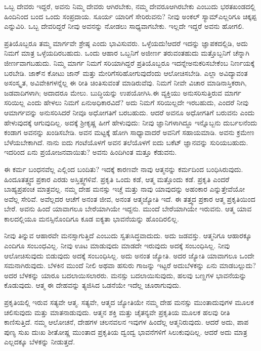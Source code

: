 ಒಬ್ಬ ದೇವರು ಇದ್ದರೆ, ಅವನು ನಿಮ್ಮ ದೇವರು ಆಗಿರಬೇಕು, ನಮ್ಮ ದೇವರೂ\break ಆಗಿರಬೇಕು ಎಂಬುದು ಭರತಖಂಡದಲ್ಲಿ ಹಿಂದಿನಿಂದ ಬಂದ ಒಂದು ಸಂಪ್ರದಾಯ. ಸೂರ್ಯ ಯಾರಿಗೆ ಸೇರಿರುವನು? ನೀವು ಅಂಕಲ್​ ಸ್ಯಾಮ್​ ಎಲ್ಲರಿಗೂ ಚಿಕ್ಕಪ್ಪ ಎನ್ನುವಿರಿ. ಒಬ್ಬ ದೇವರಿದ್ದರೆ ನೀವು ಅವನನ್ನು ನೋಡಲು ಸಾಧ್ಯವಾಗಬೇಕು. ಇಲ್ಲದೇ ಇದ್ದರೆ ಅವನು ಹೋಗಲಿ.

ಪ್ರತಿಯೊಬ್ಬರೂ ತಮ್ಮ ಮಾರ್ಗವೇ ಶ್ರೇಷ್ಠ ಎಂದು ಭಾವಿಸುವರು. ಒಳ್ಳೆಯದು!\break ಆದರೆ ಇದನ್ನು ಜ್ಞಾಪಕದಲ್ಲಿಡಿ, ಅದು ನಿಮಗೆ ಮಾತ್ರ ಒಳ್ಳೆಯದಿರಬಹುದು. ಒಂದು ಆಹಾರ ಒಬ್ಬನಿಗೆ ಅಜೀರ್ಣ ತರುವಂತಹುದು ಮತ್ತೊಬ್ಬನಿಗೆ ಚೆನ್ನಾಗಿ ಜೀರ್ಣವಾಗಬಹುದು. ನಿಮ್ಮ ಮಾರ್ಗ ನಿಮಗೆ ಸರಿಯಾಗಿದ್ದರೆ ಪ್ರತಿಯೊಬ್ಬರೂ ಇದನ್ನೇ\break ಅನುಕರಿಸಬೇಕೆಂಬ ನಿರ್ಣಯಕ್ಕೆ ಬರಬೇಡಿ. ಜಾಕ್​ನ ಕೋಟು ಜಾನ್​ ಮತ್ತು ಮೇರಿಗೆ\break ಸರಿಹೋಗುವುದೆಂದು ಆಲೋಚಿಸಬೇಡಿ. ಎಲ್ಲಾ ಅವಿದ್ಯಾವಂತ ಅಸಂಸ್ಕೃತ, ಅವಿವೇಕಿಗಳನ್ನೆಲ್ಲ ಈ ರೀತಿ ಚಿಂತಿಸುವಂತೆ ಮಾಡಿರುವೆವು. ನಿಮಗೆ ನೀವೇ ವಿಚಾರ ಮಾಡಿ\break ನಾಸ್ತಿಕರಾಗಿ, ಜಡವಾದಿಗಳಾಗಿ; ಅದಾದರೂ ಮೇಲು. ಬುದ್ಧಿಯನ್ನು ಉಪಯೋಗಿಸಿ.\break ಈ ವ್ಯಕ್ತಿಯು ಅನುಸರಿಸುತ್ತಿರುವ ಮಾರ್ಗ ಸರಿಯಿಲ್ಲ ಎಂದು ಹೇಳಲು ನಿಮಗೆ ಏನು\break ಅಧಿಕಾರವಿದೆ? ಅದು ನಿಮಗೆ ಸರಿಯಿಲ್ಲದೇ ಇರಬಹುದು, ಎಂದರೆ ನೀವು ಆ\break ಮಾರ್ಗವನ್ನು ಅನುಸರಿಸಿದರೆ ನೀವೂ ಅಧೋಗತಿಗೆ ಬರಬಹುದು. ಆದರೆ ಅವನೂ ಅಧೋಗತಿಗೆ ಬರುವನು ಎಂದು ಹೇಳುವುದಕ್ಕೆ ಆಗುವುದಿಲ್ಲ. ಅದಕ್ಕೆ ಶ‍್ರೀಕೃಷ್ಣ ಹೀಗೆ ಹೇಳುವುದು: ನೀವು ಜ್ಞಾನಿಗಳಾಗಿದ್ದೂ ಇನ್ನೊಬ್ಬನು ದುರ್ಬಲನೆಂದು ಕಂಡಾಗ ಅವನನ್ನು ಖಂಡಿಸಬೇಡಿ. ಅವನ ಮಟ್ಟಕ್ಕೆ ಹೋಗಿ ಸಾಧ್ಯಾವಾದರೆ ಅವನಿಗೆ ಸಹಾಯಮಾಡಿ. ಅವನು ಕ್ರಮೇಣ ಬೆಳೆಯಬೇಕಾಗಿದೆ. ನಾನು ಐದು ಗಂಟೆಯೊಳಗೆ ಅವನ ತಲೆಯೊಳಗೆ ಐದು ಬಕೆಟ್​ ಜ್ಞಾನವನ್ನು ಸುರಿಯಬಹುದು. ಇದರಿಂದ ಏನು ಪ್ರಯೋಜನವಾಯಿತು? ಅವನು ಹಿಂದಿಗಿಂತ ಮತ್ತೂ ಕೆಡುವನು.

ಈ ಕರ್ಮ ಬಂಧನವೆಲ್ಲ ಎಲ್ಲಿಂದ ಬಂದಿತು? ಇದಕ್ಕೆ ಕಾರಣವೇ ನಾವು ಆತ್ಮನನ್ನು ಕರ್ಮದಿಂದ ಬಂಧಿಸಿರುವುದು. ಹಿಂದೂತತ್ತ್ವದ ಪ್ರಕಾರ ಎರಡು ಅಸ್ತಿತ್ತ್ವಗಳಿವೆ. ಪ್ರಕೃತಿ ಒಂದು ಕಡೆ, ಆತ್ಮ ಮತ್ತೊಂದು ಕಡೆ. ಪ್ರಕೃತಿ ಎಂದರೆ ಬಾಹ್ಯಪ್ರಪಂಚ ಮಾತ್ರವಲ್ಲ. ನಮ್ಮ ದೇಹ ಮನಸ್ಸು ಇಚ್ಚೆ ಮತ್ತು ನಾವು ಯಾವುದನ್ನು ಅಹಂಕಾರ ಎನ್ನುತ್ತೇವೆಯೋ ಅವೆಲ್ಲ ಸೇರಿವೆ. ಅವೆಲ್ಲದರ ಆಚೆಗೆ ಅನಂತ ಜೀವ, ಅನಂತ ಆತ್ಮಜ್ಯೋತಿ ಇದೆ. ಈ ತತ್ತ್ವದ ಪ್ರಕಾರ ಆತ್ಮ ಪ್ರಕೃತಿಯಿಂದ ಬೇರೆ. ಅವನು ಹಿಂದೆ ಯಾವಾಗಲೂ ಬೇರೆಯಾಗಿಯೇ ಇದ್ದನು. ಮುಂದೆ ಬೇರೆಯಾಗಿಯೇ ಇರುವನು. ಆತ್ಮ ಯಾವ ಕಾಲದಲ್ಲಿಯೂ ಮನಸ್ಸಿನೊಂದಿಗೂ ಕೂಡ ಐಕ್ಯತಾ ಭಾವನೆಯನ್ನು ಹೊಂದಿರಲಿಲ್ಲ.

ನೀವು ತಿನ್ನುವ ಆಹಾರವೇ ಮನಸ್ಸಾಗುತ್ತಿದೆ ಎಂಬುದು ಸ್ವತಃಸಿದ್ಧವಾದುದು. ಅದು ಜಡವಸ್ತು. ಆತ್ಮನಿಗೂ ಆಹಾರಕ್ಕೂ ಎಂದಿಗೂ ಸಂಬಂಧವಿಲ್ಲ. ನೀವು ಊಟ ಮಾಡುವುದು ಮಾಡದೇ ಇರುವುದು ಅದಕ್ಕೆ ಸಂಬಂಧಿಸಿಲ್ಲ. ನೀವು ಆಲೋಚಿಸುವುದು ಬಿಡುವುದು ಅದಕ್ಕೆ ಸಂಬಂಧಿಸಿಲ್ಲ. ಅದು ಅನಂತ ಜ್ಯೋತಿ. ಅದರ ಜ್ಯೋತಿ ಯಾವಾಗಲೂ ಒಂದೇ ಸಮನಾಗಿರುವುದು. ಬೆಳಕಿನ ಮುಂದೆ ನೀಲಿ ಅಥವಾ ಹಸುರು ಗಾಜನ್ನು ಇಟ್ಟರೆ ಅದು\break ಬೆಳಕನ್ನು ಏನು ಮಾಡಬಲ್ಲುದು? ಅದರ ಬೆಳಕನ್ನು ಯಾರೂ ಬದಲಾಯಿಸಲಾರರು. ಮನಸ್ಸು ಬದಲಾಯಿಸುವುದು, ಹಲವು ಬಣ್ಣಗಳ ಭಾವನೆಯನ್ನು ಕೊಡುವುದು. ಆತ್ಮ ಈ ದೇಹವನ್ನು ತ್ಯಜಿಸಿದ ಒಡನೆಯೇ ಇದೆಲ್ಲ ಚೂರಾಗುವುದು.

ಪ್ರಕೃತಿಯಲ್ಲಿ ಇರುವ ಸತ್ಯವೇ ಆತ್ಮ. ಸತ್ಯವೇ, ಆತ್ಮದ ಜ್ಯೋತಿಯೇ ನಮ್ಮ ದೇಹ ಮನಸ್ಸು ಮುಂತಾದುವುಗಳ ಮೂಲಕ ಚಲಿಸುವುದು ಮತ್ತು ಮಾತನಾಡುವುದು. ಆತ್ಮನ ಶಕ್ತಿ ಮತ್ತು ಚೈತನ್ಯವೇ ಪ್ರಕೃತಿಯ ಮೂಲಕ ಹಲವು ರೀತಿ ಕಾಣಿಸುತ್ತಿದೆ. ನಮ್ಮ ಆಲೋಚನೆ, ದೇಹಗಳ ಚಲನವಲನ ಇವುಗಳ ಹಿಂದೆಲ್ಲ ಆತ್ಮನಿರುವುದು. ಆದರೆ ಅದು, ಪಾಪ ಪುಣ್ಯ ಸುಖ ದುಃಖ ಶೀತೋಷ್ಣ ಮುಂತಾದ ಪ್ರಕೃತಿಯ ದ್ವಂದ್ವ ಭಾವನೆಗಳಿಗೆ ಸಿಲುಕುವುದಿಲ್ಲ. ಆದರೆ ಅದು ಮಾತ್ರ ಎಲ್ಲದಕ್ಕೂ ಬೆಳಕನ್ನು ನೀಡುತ್ತದೆ.

